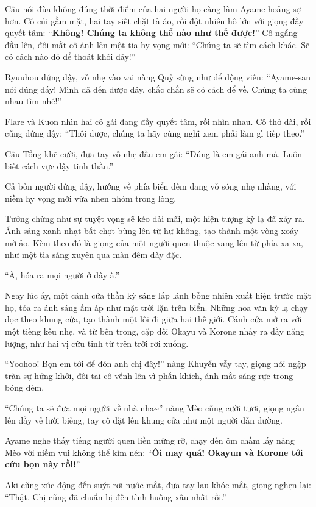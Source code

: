 \documentclass[../main.tex]{subfiles}
\begin{document}
Câu nói đùa không đúng thời điểm của hai người họ càng làm Ayame hoảng sợ hơn. Cô cúi gằm mặt, hai tay siết chặt tà áo, rồi đột nhiên hô lớn với giọng đầy quyết tâm: ``\textbf{Không! Chúng ta không thể nào như thế được!}'' Cô ngẩng đầu lên, đôi mắt cô ánh lên một tia hy vọng mới: ``Chúng ta sẽ tìm cách khác. Sẽ có cách nào đó để thoát khỏi đây!''

Ryuuhou đứng dậy, vỗ nhẹ vào vai nàng Quỷ sừng như để động viên: ``Ayame-san nói đúng đấy! Mình đã đến được đây, chắc chắn sẽ có cách để về. Chúng ta cùng nhau tìm nhé!''

Flare và Kuon nhìn hai cô gái đang đầy quyết tâm, rồi nhìn nhau. Cô thở dài, rồi cũng đứng dậy: ``Thôi được, chúng ta hãy cùng nghĩ xem phải làm gì tiếp theo.''

Cậu Tổng khẽ cười, đưa tay vỗ nhẹ đầu em gái: ``Đúng là em gái anh mà. Luôn biết cách vực dậy tinh thần.''

Cả bốn người đứng dậy, hướng về phía biển đêm đang vỗ sóng nhẹ nhàng, với niềm hy vọng mới vừa nhen nhóm trong lòng.

Tưởng chừng như sự tuyệt vọng sẽ kéo dài mãi, một hiện tượng kỳ lạ đã xảy ra. Ánh sáng xanh nhạt bất chợt bùng lên từ hư không, tạo thành một vòng xoáy mờ ảo. Kèm theo đó là giọng của một người quen thuộc vang lên từ phía xa xa, như một tia sáng xuyên qua màn đêm dày đặc.

``À, hóa ra mọi người ở đây à.''

Ngay lúc ấy, một cánh cửa thần kỳ sáng lấp lánh bỗng nhiên xuất hiện trước mặt họ, tỏa ra ánh sáng ấm áp như mặt trời lặn trên biển. Những hoa văn kỳ lạ chạy dọc theo khung cửa, tạo thành một lối đi giữa hai thế giới. Cánh cửa mở ra với một tiếng kêu nhẹ, và từ bên trong, cặp đôi Okayu và Korone nhảy ra đầy năng lượng, như hai vị cứu tinh từ trên trời rơi xuống.


``Yoohoo! Bọn em tới để đón anh chị đây!'' nàng Khuyển vẫy tay, giọng nói ngập tràn sự hứng khởi, đôi tai cô vểnh lên vì phấn khích, ánh mắt sáng rực trong bóng đêm.

``Chúng ta sẽ đưa mọi người về nhà nha\~{}'' nàng Mèo cũng cười tươi, giọng ngân lên đầy vẻ lười biếng, tay cô đặt lên khung cửa như một người dẫn đường.

Ayame nghe thấy tiếng người quen liền mừng rỡ, chạy đến ôm chầm lấy nàng Mèo với niềm vui không thể kìm nén: ``\textbf{Ôi may quá! Okayun và Korone tới cứu bọn này rồi!}''

Aki cũng xúc động đến suýt rơi nước mắt, đưa tay lau khóe mắt, giọng nghẹn lại: ``Thật. Chị cũng đã chuẩn bị đến tình huống xấu nhất rồi.''
\end{document}
